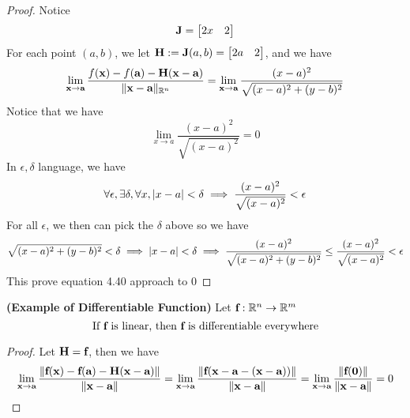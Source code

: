 \documentclass{report}
\begin{document}
\begin{proof}
Notice 
\begin{equation}
\textbf{J}=\begin{bmatrix}
  2x&2
\end{bmatrix}
\end{equation}
For each point $(a,b)$, we let $\textbf{H}:=\textbf{J}(a,b)=\begin{bmatrix}
  2a&2
\end{bmatrix}$, and we have
\begin{equation}
\lim_{\textbf{x}\to \textbf{a}}\frac{f(\textbf{x})-f(\textbf{a})-\textbf{H}(\textbf{x}-\textbf{a})}{\| \textbf{x}-\textbf{a} \|_{\mathbb{R}^n}}=\lim_{\textbf{x}\to \textbf{a}}\frac{(x-a)^2}{\sqrt{(x-a)^2+(y-b)^2}}
\end{equation}
Notice that we have
\begin{equation}
\lim_{x\to a}\frac{(x-a)^2}{\sqrt{(x-a)^2} }=0
\end{equation}
In $\epsilon,\delta$ language, we have
\begin{equation}
\forall \epsilon,\exists \delta, \forall x, |x-a|<\delta \implies \frac{(x-a)^2}{\sqrt{(x-a)^2} }<\epsilon  
\end{equation}
For all $\epsilon $, we then can pick the $\delta$ above so we have
\begin{equation}
\sqrt{(x-a)^2+(y-b)^2}<\delta \implies |x-a|<\delta\implies \frac{(x-a)^2}{\sqrt{(x-a)^2+(y-b)^2} }\leq  \frac{(x-a)^2}{\sqrt{(x-a)^2} } <\epsilon 
\end{equation}
This prove equation 4.40 approach to 0
\end{proof}
\begin{theorem}
\label{4.2.8}
\textbf{(Example of Differentiable Function)} Let $\textbf{f}:\mathbb{R}^n\rightarrow \mathbb{R}^m$ 
\begin{equation}
\text{ If $\textbf{f}$ is linear, then $\textbf{f}$ is differentiable everywhere }
\end{equation}
\end{theorem}
\begin{proof}
Let $\textbf{H}=\textbf{f}$, then we have 
\begin{equation}
  \lim_{\textbf{x}\to \textbf{a}}\frac{\| \textbf{f}(\textbf{x})-\textbf{f}(\textbf{a})-\textbf{H}(\textbf{x}-\textbf{a}) \|}{\| \textbf{x}-\textbf{a} \|}=\lim_{\textbf{x}\to \textbf{a}}\frac{\| \textbf{f}(\textbf{x}-\textbf{a}-(\textbf{x}-\textbf{a})) \|}{\| \textbf{x}-\textbf{a} \|}=\lim_{\textbf{x}\to \textbf{a}}\frac{\| \textbf{f}(\textbf{0}) \|}{\| \textbf{x}-\textbf{a} \|}=0
\end{equation}
\end{proof}
\end{document}
